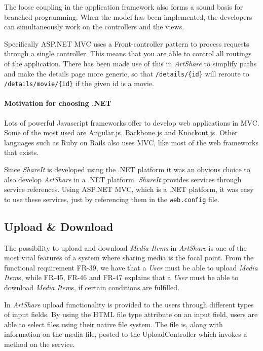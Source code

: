 \documentclass[../report.tex]{subfiles}
\begin{document}
The loose coupling in the application framework also forms a sound basis for branched programming. When the model has been implemented, the developers can simultaneously work on the controllers and the views.

Specifically ASP.NET MVC uses a Front-controller pattern to process requests through a single controller. This means that you are able to control all routings of the application. There has been made use of this in \textit{ArtShare} to simplify paths and make the details page more generic, so that \texttt{/details/\{id\}} will reroute to \texttt{/details/movie/\{id\}} if the given id is a movie.

\paragraph{Motivation for choosing .NET}
Lots of powerful Javascript frameworks offer to develop web applications in MVC. Some of the most used are Angular.js, Backbone.js and Knockout.js. Other languages such as Ruby on Rails also uses MVC, like most of the web frameworks that exists.

Since \textit{ShareIt} is developed using the .NET platform it was an obvious choice to also develop \textit{ArtShare} in a .NET platform. \textit{ShareIt} provides services through service references. Using ASP.NET MVC, which is a .NET platform, it was easy to use these services, just by referencing them in the \texttt{web.config} file. 

\subsection{Upload \& Download}

The possibility to upload and download \textit{Media Items} in \textit{ArtShare} is one of the most vital features of a system where sharing media is the focal point. From the functional requirement FR-39, we have that a \textit{User} must be able to upload \textit{Media Item}s, while FR-45, FR-46 and FR-47 explains that a \textit{User} must be able to download \textit{Media Item}s, if certain conditions are fulfilled.

In \textit{ArtShare} upload functionality is provided to the users through different types of input fields. By using the HTML file type attribute\cite{w3schools2014} on an input field, users are able to select files using their native file system. The file is, along with information on the media file, posted to the UploadController which invokes a method on the service.
\end{document}
